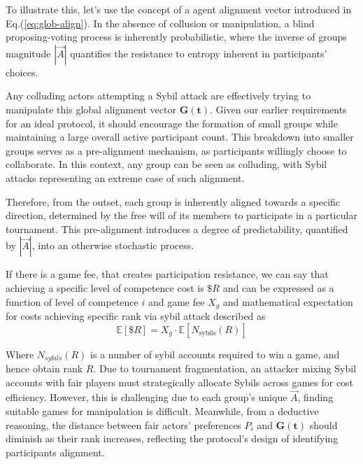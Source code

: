 \documentclass{article}
\begin{document}
\begin{CJK}{UTF8}{gbsn}
\begin{multicols}{2}
        To illustrate this, let's use the concept of a agent alignment vector introduced in Eq.(\ref*{eq:glob-align}). In the absence of collusion or manipulation, a blind proposing-voting process is inherently probabilistic, where the inverse of groups  magnitude $|\vec{A}|$ quantifies the resistance to entropy inherent in participants' choices.


        Any colluding actors attempting a Sybil attack are effectively trying to manipulate this global alignment vector $\mathbf{G(t)}$. Given our earlier requirements for an ideal protocol, it should encourage the formation of small groups while maintaining a large overall active participant count. This breakdown into smaller groups serves as a pre-alignment mechanism, as participants willingly choose to collaborate. In this context, any group can be seen as colluding, with Sybil attacks representing an extreme case of such alignment.

        Therefore, from the outset, each group is inherently aligned towards a specific direction, determined by the free will of its members to participate in a particular tournament. This pre-alignment introduces a degree of predictability, quantified by $|\vec{A}|$, into an otherwise stochastic process.


        If there is a game fee, that creates participation resistance, we can say that achieving a specific level of competence cost is $\$R$ and can be expressed as a function of level of competence $i$ and game fee $X_g$ and mathematical expectation for costs achieving specific rank via sybil attack described as
            \begin{equation}
                \mathbb{E}[\$R] = X_g \cdot \mathbb{E}[N_{\text{sybils}}(R)]
            \end{equation}


            Where $N_{sybils}(R)$ is a number of sybil accounts required to win a game, and hence obtain rank $R$. Due to tournament fragmentation, an attacker mixing Sybil accounts with fair players must strategically allocate Sybils across games for cost efficiency. However, this is challenging due to each group's unique $\vec{A}$, finding suitable games for manipulation is difficult.  Meanwhile, from a deductive reasoning, the distance between fair actors' preferences $P_i$ and $\mathbf{G(t)}$ should diminish as their rank increases, reflecting the protocol's design of identifying participants alignment.



\end{multicols}
\end{CJK}
\end{document}
